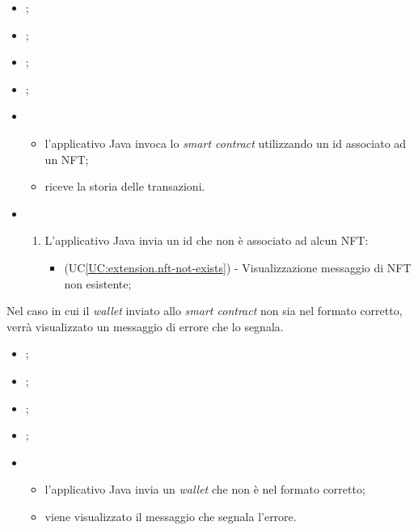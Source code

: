 \begin{itemize}
  \item {};
  \item {};
  \item {};
  \item {};

  \item \UCMain
  \begin{itemize}
    \item l'applicativo Java invoca lo \textit{smart contract} utilizzando un id associato ad un NFT;
    \item riceve la storia delle transazioni.
  \end{itemize}
  
  \item \UCExt
  \begin{enumerate}[label=\lett]
    \item L'applicativo Java invia un id che non è associato ad alcun NFT:
    \begin{itemize}
      \item (UC\ref{UC:extension.nft-not-exists}) - Visualizzazione messaggio di NFT non esistente;
    \end{itemize}
  \end{enumerate}
\end{itemize}

\label{UC:extension.wallet-not-correct}

Nel caso in cui il \textit{wallet} inviato allo \textit{smart contract} non sia nel formato corretto, verrà visualizzato un messaggio di errore che lo segnala.

\begin{itemize}
  \item {};
  \item {};
  \item {};
  \item {};
  
  \item \UCMain
  \begin{itemize}
    \item l'applicativo Java invia un \textit{wallet} che non è nel formato corretto;
    \item viene visualizzato il messaggio che segnala l'errore.
  \end{itemize}
\end{itemize}

